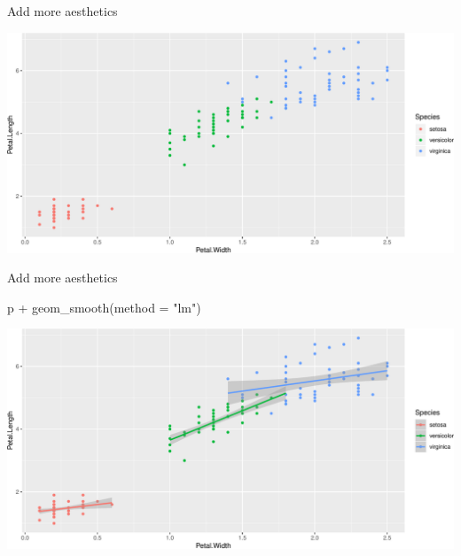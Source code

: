 \documentclass[14pt,ignorenonframetext,]{bredelebeamer}
\newenvironment{Shaded}{\begin{snugshade}}{\end{snugshade}}
\newcommand{\KeywordTok}[1]{\textcolor[rgb]{0.94,0.87,0.69}{#1}}
\newcommand{\DataTypeTok}[1]{\textcolor[rgb]{0.87,0.87,0.75}{#1}}
\newcommand{\StringTok}[1]{\textcolor[rgb]{0.80,0.58,0.58}{#1}}
\newcommand{\CommentTok}[1]{\textcolor[rgb]{0.50,0.62,0.50}{#1}}
\newcommand{\OperatorTok}[1]{\textcolor[rgb]{0.94,0.94,0.82}{#1}}
\newcommand{\NormalTok}[1]{\textcolor[rgb]{0.80,0.80,0.80}{#1}}
\begin{document}
\begin{frame}[fragile]{Add more aesthetics}

\begin{Shaded}
\end{Shaded}

\includegraphics{tidyverse_28_03_files/figure-beamer/unnamed-chunk-70-1.pdf}

\end{frame}

\begin{frame}[fragile]{Add more aesthetics}

\begin{Shaded}
\begin{Highlighting}[]
\NormalTok{p }\OperatorTok{+}\StringTok{ }\KeywordTok{geom_smooth}\NormalTok{(}\DataTypeTok{method =} \StringTok{"lm"}\NormalTok{)}
\end{Highlighting}
\end{Shaded}

\includegraphics{tidyverse_28_03_files/figure-beamer/unnamed-chunk-71-1.pdf}

\end{frame}
\end{document}
